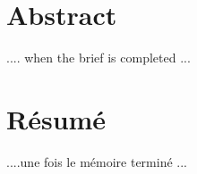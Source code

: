 \documentclass[a4paper,12pt]{report}
\theoremstyle{plain}				%
\theoremstyle{definition}				%
\begin{document}


\section*{Abstract} \label{sec:abstract}
.... when the brief is completed ...

\bigskip
{}
\section*{Résumé} \label{sec:resume}
....une fois le mémoire terminé ...
\end{document}
